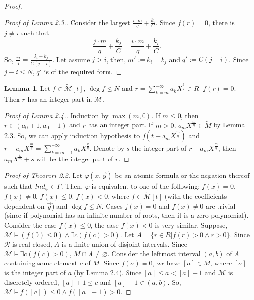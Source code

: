 \documentclass[a4paper,14pt]{article}
\theoremstyle{definition}
\theoremstyle{theorem}
\theoremstyle{lemma}
\newtheorem{lemma}{Lemma}[section]
\theoremstyle{proposition}
\theoremstyle{remark}
\theoremstyle{corollary}
\theoremstyle{problem}
\theoremstyle{hypothesis}
\begin{document}
\begin{proof}
\begin{proof}[Proof of Lemma 2.3.]
        Consider the largest $\frac{i\cdot m}{q} + \frac{k_i}{C}$. Since $f(r) = 0$, there is $j \neq i$ such that $$\frac{j\cdot m}{q} + \frac{k_j}{C} = \frac{i\cdot m}{q} + \frac{k_i}{C}.$$
        So, $\frac{m}{q} = \frac{k_i - k_j}{C(j - i)}$. Let assume $j > i$, then, $m' := k_i - k_j$ and $q' := C(j - i)$. Since $j - i \leqslant N$, $q'$ is of the required form.
    \end{proof}
    
    \begin{lemma}
        Let $f \in \widetilde{\mathcal M}[t]$, $\deg f \leqslant N$ and $r = \sum\limits_{k = m}^{-\infty}a_k X^{\frac{k}{q}}\in R$, $f(r) = 0$. Then $r$ has an integer part in $\widetilde{\mathcal M}$.
    \end{lemma}
    
    \begin{proof}[Proof of Lemma 2.4.]
        Induction by $\max(m, 0)$. If $m \leqslant 0$, then $r \in (a_0 + 1, a_0 - 1)$ and $r$ has an integer part. If $m > 0$, $a_m X^{\frac{m}{q}} \in \widetilde{M}$ by Lemma 2.3. So, we can apply induction hypothesis to $f(t + a_m X^{\frac{m}{q}})$ and $r - a_m X^{\frac{m}{q}} = \sum\limits_{k = m - 1}^{-\infty}a_k X^{\frac{k}{q}}$. Denote by $s$ the integer part of $r - a_m X^{\frac{m}{q}}$, then $a_m X^{\frac{k}{m}} + s$ will be the integer part of $r$.
    \end{proof}
    
    \textit{Proof of Theorem 2.2.}
    Let $\varphi(x, \vec{y})$ be an atomic formula or the negation thereof such that $Ind_{\varphi} \in \Gamma$. Then, $\varphi$ is equivalent to one of the following: $f(x) = 0$, $f(x) \neq 0$, $f(x) \leqslant 0$, $f(x) < 0$, where $f \in \widetilde{\mathcal M}[t]$ (with the coefficients dependent on $\vec{y}$) and $\deg f \leqslant N$. Cases $f(x) = 0$ and $f(x) \neq 0$ are trivial (since if polynomial has an infinite number of roots, then it is a zero polynomial). Consider the case $f(x) \leqslant 0$, the case $f(x) < 0$ is very similar. Suppose, $\mathcal M \vDash (f(0) \leqslant 0) \wedge \exists c (f(c) > 0)$. Let $A = \{r \in R | f(r) > 0 \wedge r > 0\}$. Since $\mathcal R$ is real closed, $A$ is a finite union of disjoint intervals. Since $\mathcal M \vDash \exists c (f(c) > 0)$, $M \cap A \ne \varnothing$. Consider the leftmost interval $(a, b)$ of $A$ containing some element $c$ of $M$. Since $f(a) = 0$, we have $[a] \in M$, where $[a]$ is the integer part of $a$ (by Lemma 2.4). Since $[a] \leqslant a < [a] + 1$ and $\mathcal M$ is discretely ordered, $[a] + 1 \leqslant c$ and $[a] + 1 \in (a, b)$. So, $\mathcal M \vDash f([a]) \leqslant 0 \wedge f([a] + 1) > 0$.
\end{proof}
\end{document}
